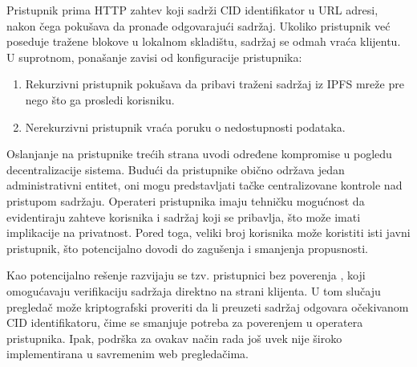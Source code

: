 Pristupnik prima HTTP zahtev koji sadrži CID identifikator u URL adresi, nakon čega pokušava da pronađe odgovarajući sadržaj. Ukoliko pristupnik već poseduje tražene blokove u lokalnom skladištu, sadržaj se odmah vraća klijentu. U suprotnom, ponašanje zavisi od konfiguracije pristupnika:
\begin{enumerate}
\item Rekurzivni pristupnik pokušava da pribavi traženi sadržaj iz IPFS mreže pre nego što ga prosledi korisniku.
\item Nerekurzivni pristupnik vraća poruku o nedostupnosti podataka.
\end{enumerate}

Oslanjanje na pristupnike trećih strana uvodi određene kompromise u pogledu decentralizacije sistema. Budući da pristupnike obično održava jedan administrativni entitet, oni mogu predstavljati tačke centralizovane kontrole nad pristupom sadržaju. Operateri pristupnika imaju tehničku mogućnost da evidentiraju zahteve korisnika i sadržaj koji se pribavlja, što može imati implikacije na privatnost. Pored toga, veliki broj korisnika može koristiti isti javni pristupnik, što potencijalno dovodi do zagušenja i smanjenja propusnosti.

Kao potencijalno rešenje razvijaju se tzv. pristupnici bez poverenja , koji omogućavaju verifikaciju sadržaja direktno na strani klijenta. U tom slučaju pregledač može kriptografski proveriti da li preuzeti sadržaj odgovara očekivanom CID identifikatoru, čime se smanjuje potreba za poverenjem u operatera pristupnika. Ipak, podrška za ovakav način rada još uvek nije široko implementirana u savremenim web pregledačima.